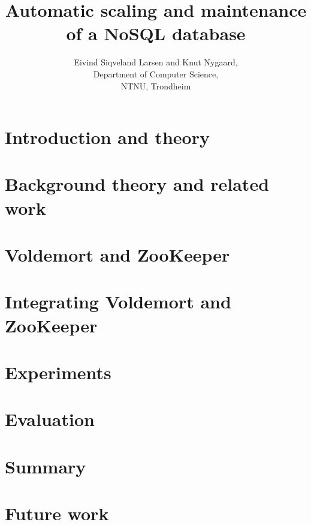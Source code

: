 \documentclass[a4paper, 12pt]{report}
\title{Automatic scaling and maintenance of a NoSQL database}
\author{Eivind Siqveland Larsen and Knut Nygaard,\\
        Department of Computer Science,\\
        NTNU,
        Trondheim}
\begin{document}
\maketitle
\thispagestyle{empty}

\clearpage


\clearpage


\clearpage


\clearpage

\tableofcontents
\clearpage


\listoffigures
\clearpage
\setcounter{page}{1}

\chapter{Introduction and theory}
\label{chapter:introduction}


\clearpage


\clearpage

\chapter{Background theory and related work}

\clearpage


\clearpage


\clearpage



\chapter{Voldemort and ZooKeeper}

\clearpage


\clearpage

\chapter{Integrating Voldemort and ZooKeeper}
\label{chapter:implementation}

\clearpage

\chapter{Experiments}
\label{chapter:results}



\chapter{Evaluation}
\label{chapter:evaluation}


\chapter{Summary}
\label{chapter:summary}


\chapter{Future work}
\label{chapter:futurework}




\end{document}
